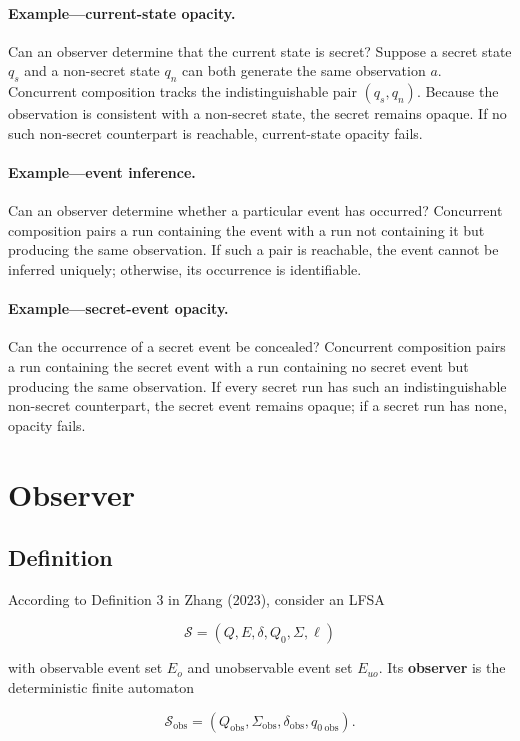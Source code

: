 \documentclass[11pt]{article}
\begin{document}
\paragraph{Example---current-state opacity.}
Can an observer determine that the current state is secret? Suppose a secret state $q_s$ and a non-secret state $q_n$ can both generate the same observation $a$. Concurrent composition tracks the indistinguishable pair $(q_s,q_n)$. Because the observation is consistent with a non-secret state, the secret remains opaque. If no such non-secret counterpart is reachable, current-state opacity fails.

\paragraph{Example---event inference.}
Can an observer determine whether a particular event has occurred? Concurrent composition pairs a run containing the event with a run not containing it but producing the same observation. If such a pair is reachable, the event cannot be inferred uniquely; otherwise, its occurrence is identifiable.

\paragraph{Example---secret-event opacity.}
Can the occurrence of a secret event be concealed? Concurrent composition pairs a run containing the secret event with a run containing no secret event but producing the same observation. If every secret run has such an indistinguishable non-secret counterpart, the secret event remains opaque; if a secret run has none, opacity fails.

\section{Observer}

\subsection{Definition}

According to Definition 3 in Zhang (2023), consider an LFSA

\[
\mathcal S=(Q,E,\delta,Q_0,\Sigma,\ell)
\]

with observable event set $E_o$ and unobservable event set $E_{uo}$. Its \textbf{observer} is the deterministic finite automaton

\[
\mathcal S_{\mathrm{obs}}
=(Q_{\mathrm{obs}},\Sigma_{\mathrm{obs}},
\delta_{\mathrm{obs}},q_{0\ \mathrm{obs}}).
\]
\end{document}
